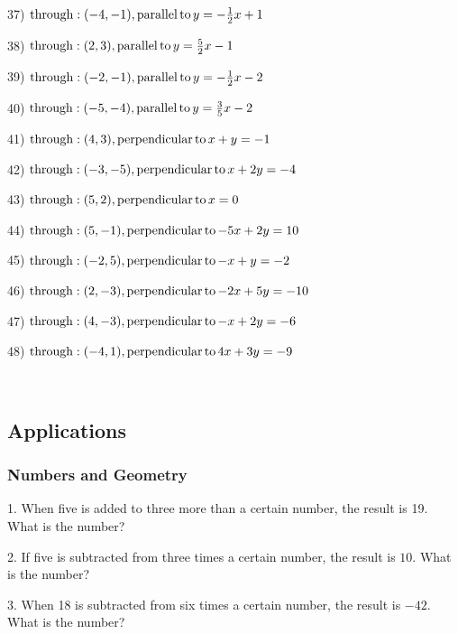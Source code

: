 37) $\operatorname{through} : (- 4, - 1), \operatorname{parallel} \operatorname{to} y = - \frac{1}{2}
x + 1$

38) $\operatorname{through} : (2, 3), \operatorname{parallel} \operatorname{to} y = \frac{5}{2} x - 1$

39) $\operatorname{through} : (- 2, - 1), \operatorname{parallel} \operatorname{to} y = - \frac{1}{2}
x - 2$

40) $\operatorname{through} : (- 5, - 4), \operatorname{parallel} \operatorname{to} y = \frac{3}{5} x
- 2$

41) $\operatorname{through} : (4, 3), \operatorname{perpendicular} \operatorname{to} x + y = - 1$

42) $\operatorname{through} : (- 3, - 5), \operatorname{perpendicular} \operatorname{to} x + 2 y = -
4$

43) $\operatorname{through} : (5, 2), \operatorname{perpendicular} \operatorname{to} x = 0$

44) $\operatorname{through} : (5, - 1), \operatorname{perpendicular} \operatorname{to} - 5 x + 2 y =
10$

45) $\operatorname{through} : (- 2, 5), \operatorname{perpendicular} \operatorname{to} - x + y = - 2$

46) $\operatorname{through} : (2, - 3), \operatorname{perpendicular} \operatorname{to} - 2 x + 5 y = -
10$

47) $\operatorname{through} : (4, - 3), \operatorname{perpendicular} \operatorname{to} - x + 2 y = -
6$

48) $\operatorname{through} : (- 4, 1), \operatorname{perpendicular} \operatorname{to} 4 x + 3 y = -
9$

\vspace{3in}
~

\pagebreak

\subsection{Applications}\par

	\subsubsection{Numbers and Geometry}\par

{}

1. When five is added to three more than a certain number, the result is 19.  What is the number?

2. If five is subtracted from three times a certain number, the result is
$10$. What is the number?

3. When 18 is subtracted from six times a certain number, the result is $-
42$. What is the number?

